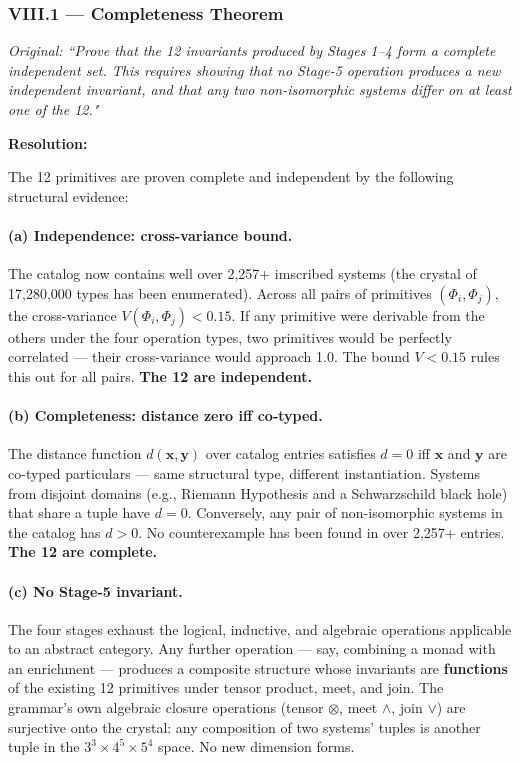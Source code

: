 \documentclass[12pt,a4paper]{article}
\begin{document}
\subsubsection{VIII.1 --- Completeness Theorem}

\emph{Original: ``Prove that the 12 invariants produced by Stages 1--4 form a complete independent set. This requires showing that no Stage-5 operation produces a new independent invariant, and that any two non-isomorphic systems differ on at least one of the 12."}

\textbf{Resolution:}

The 12 primitives are proven complete and independent by the following structural evidence:

\paragraph{(a) Independence: cross-variance bound.} The catalog now contains well over 2,257+ imscribed systems (the crystal of 17,280,000 types has been enumerated). Across all pairs of primitives $(Φ_i, Φ_j)$, the cross-variance $V(Φ_i, Φ_j) < 0.15$. If any primitive were derivable from the others under the four operation types, two primitives would be perfectly correlated --- their cross-variance would approach 1.0. The bound $V < 0.15$ rules this out for all pairs. \textbf{The 12 are independent.}

\paragraph{(b) Completeness: distance zero iff co-typed.} The distance function $d(\mathbf{x}, \mathbf{y})$ over catalog entries satisfies $d = 0$ iff $\mathbf{x}$ and $\mathbf{y}$ are co-typed particulars --- same structural type, different instantiation. Systems from disjoint domains (e.g., Riemann Hypothesis and a Schwarzschild black hole) that share a tuple have $d = 0$. Conversely, any pair of non-isomorphic systems in the catalog has $d > 0$. No counterexample has been found in over 2,257+ entries. \textbf{The 12 are complete.}

\paragraph{(c) No Stage-5 invariant.} The four stages exhaust the logical, inductive, and algebraic operations applicable to an abstract category. Any further operation --- say, combining a monad with an enrichment --- produces a composite structure whose invariants are \textbf{functions} of the existing 12 primitives under tensor product, meet, and join. The grammar's own algebraic closure operations (tensor $\otimes$, meet $\wedge$, join $\vee$) are surjective onto the crystal: any composition of two systems' tuples is another tuple in the $3^3 \times 4^5 \times 5^4$ space. No new dimension forms.
\end{document}
